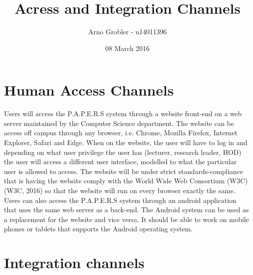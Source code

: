 \documentclass[12pt, letterpaper, twoside]{article}
\title{Acress and Integration Channels}
\author{Arno Grobler - u14011396}
\date{08 March 2016}
\begin{document}
\section{Human Access Channels}

Users will access the P.A.P.E.R.S system through a website front-end on a web server maintained by the Computer Science department. The website can be access off campus through any browser, i.e. Chrome, Mozilla Firefox, Internet Explorer, Safari and Edge. When on the website, the user will have to log in and depending on what user privilege the user has (lecturer, research leader, HOD) the user will access a different user interface, modelled to what the particular user is allowed to access. The website will be under strict standards-compliance that is having the website comply with the World Wide Web Consortium (W3C) (W3C, 2016) so that the website will run on every browser exactly the same. Users can also access the P.A.P.E.R.S system through an android application that uses the same web server as a back-end. The Android system can be used as a replacement for the website and vice versa. It should be able to work on mobile phones or tablets that supports the Android operating system.
\section{Integration channels}
\end{document}
